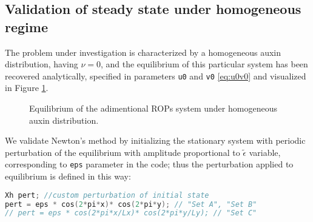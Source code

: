 \subsection{Validation of steady state under homogeneous regime}\label{sec:ValidationNewton}
The problem under investigation is characterized by a homogeneous auxin distribution, having $\nu = 0$, and the equilibrium of this particular system has been recovered analytically, specified in parameters \verb|u0| and \verb|v0| \eqref{eq:u0v0} and visualized in Figure \ref{fig:u0v0}.
\begin{figure}[H]
    \centering
    \quad
    \caption[Equilibrium of homogeneous adimentional system]{Equilibrium of the adimentional ROPs system under homogeneous auxin distribution.}
    \label{fig:u0v0}
\end{figure}

We validate Newton's method by initializing the stationary system with periodic perturbation of the equilibrium with amplitude proportional to $\tilde{\epsilon}$ variable, corresponding to \verb|eps| parameter in the code; thus the perturbation applied to equilibrium is defined in this way:
\begin{lstlisting}[firstnumber = 24, language = C++, caption = 1cell\_stationaryTest.edp: perturbation of the equilibrium]
Xh pert; //custom perturbation of initial state
pert = eps * cos(2*pi*x)* cos(2*pi*y); // "Set A", "Set B"
// pert = eps * cos(2*pi*x/Lx)* cos(2*pi*y/Ly); // "Set C"
\end{lstlisting}

